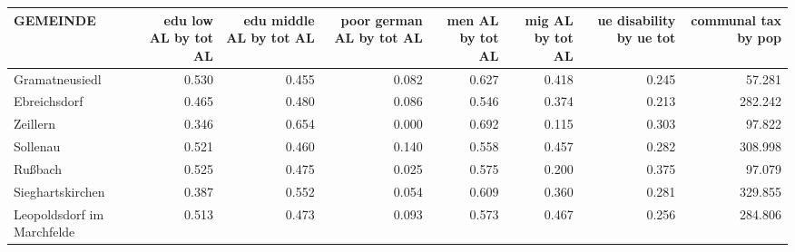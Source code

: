 
\begin{tabular}{lrrrrrrr}
\toprule
GEMEINDE & edu low AL by tot AL & edu middle AL by tot AL & poor german AL by tot AL & men AL by tot AL & mig AL by tot AL & ue disability by ue tot & communal tax by pop\\
\midrule
Gramatneusiedl & 0.530 & 0.455 & 0.082 & 0.627 & 0.418 & 0.245 & 57.281\\
Ebreichsdorf & 0.465 & 0.480 & 0.086 & 0.546 & 0.374 & 0.213 & 282.242\\
Zeillern & 0.346 & 0.654 & 0.000 & 0.692 & 0.115 & 0.303 & 97.822\\
Sollenau & 0.521 & 0.460 & 0.140 & 0.558 & 0.457 & 0.282 & 308.998\\
Rußbach & 0.525 & 0.475 & 0.025 & 0.575 & 0.200 & 0.375 & 97.079\\
Sieghartskirchen & 0.387 & 0.552 & 0.054 & 0.609 & 0.360 & 0.281 & 329.855\\
Leopoldsdorf im Marchfelde & 0.513 & 0.473 & 0.093 & 0.573 & 0.467 & 0.256 & 284.806\\
\bottomrule
\end{tabular}
